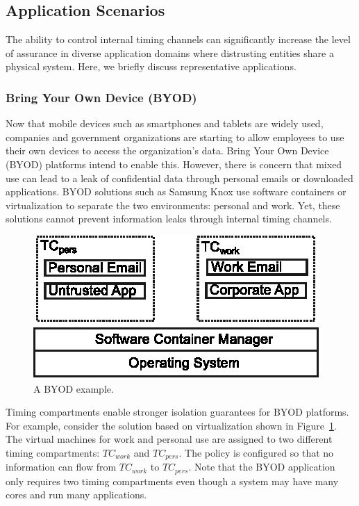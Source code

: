 \subsection{Application Scenarios}

The ability to control internal timing channels can significantly increase the
level of
assurance in diverse application domains where distrusting entities share a
physical system. Here, we briefly discuss representative applications.

\subsubsection{Bring Your Own Device (BYOD)}

Now that mobile devices such as smartphones and tablets are widely used, 
companies and government organizations are starting to allow employees to
use their own devices to access the organization's data.
Bring Your Own Device (BYOD) platforms intend to enable this. However, there is 
concern that mixed use can lead to a leak of confidential data through personal 
emails or
downloaded applications. BYOD solutions such as Samsung Knox use
software containers or virtualization to separate the two environments:
personal and work. Yet, these solutions cannot prevent information leaks
through internal timing channels.

\begin{figure}
    \begin{center}
        \includegraphics{figs/byod.eps}
        \caption{A BYOD example.}
        \label{fig:byod}
    \end{center}
\end{figure}

Timing compartments enable stronger isolation guarantees for BYOD
platforms. For example, consider the solution based on virtualization shown in 
Figure~\ref{fig:byod}. The virtual machines for
work and personal use are assigned to two different timing compartments:
$TC_{work}$ and $TC_{pers}$. The policy is configured so that no information can 
flow from $TC_{work}$ to $TC_{pers}$.
Note that the BYOD application only requires two timing compartments even
though a system may have many cores and run many applications.

